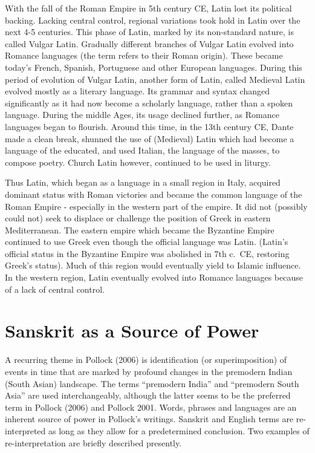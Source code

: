 With the fall of the Roman Empire in 5th century CE, Latin lost its political backing. Lacking central control, regional variations took hold in Latin over the next 4-5 centuries. This phase of Latin, marked by its non-standard nature, is called Vulgar Latin. Gradually different branches of Vulgar Latin evolved into Romance languages (the term refers to their Roman origin). These became today’s French, Spanish, Portuguese and other European languages. During this period of evolution of Vulgar Latin, another form of Latin, called Medieval Latin evolved mostly as a literary language. Its grammar and syntax changed significantly as it had now become a scholarly language, rather than a spoken language. During the middle Ages, its usage declined further, as Romance languages began to flourish. Around this time, in the 13th century CE, Dante made a clean break, shunned the use of (Medieval) Latin which had become a language of the educated, and used Italian, the language of the masses, to compose poetry. Church Latin however, continued to be used in liturgy.

Thus Latin, which began as a language in a small region in Italy, acquired dominant status with Roman victories and became the common language of the Roman Empire - especially in the western part of the empire. It did not (possibly could not) seek to displace or challenge the position of Greek in eastern Mediterranean. The eastern empire which became the Byzantine Empire continued to use Greek even though the official language was Latin. (Latin’s official status in the Byzantine Empire was abolished in 7th c.\ CE, restoring Greek’s status). Much of this region would eventually yield to Islamic influence. In the western region, Latin eventually evolved into Romance languages because of a lack of central control.

\section{Sanskrit as a Source of Power}

A recurring theme in Pollock (2006) is identification (or superimposition) of events in time that are marked by profound changes in the premodern Indian (South Asian) landscape. The terms “premodern India” and “premodern South Asia” are used interchangeably, although the latter seems to be the preferred term in Pollock (2006) and Pollock 2001. Words, phrases and languages are an inherent source of power in Pollock’s writings. Sanskrit and English terms are re-interpreted as long as they allow for a predetermined conclusion. Two examples of re-interpretation are briefly described presently. 

